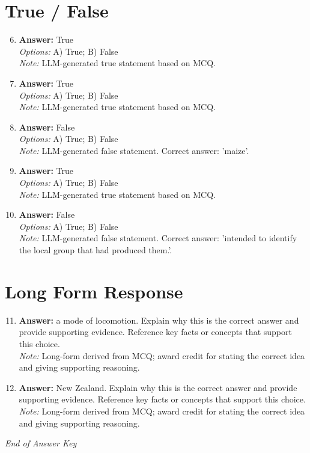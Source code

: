 \documentclass[12pt]{article}
\begin{document}
\section*{True / False}
\begin{enumerate}[label=\arabic*.]
\setcounter{enumi}{5}
\item \textbf{Answer:} True
\\ \textit{Options:} A) True; B) False
\\ \textit{Note:} LLM-generated true statement based on MCQ.
\item \textbf{Answer:} True
\\ \textit{Options:} A) True; B) False
\\ \textit{Note:} LLM-generated true statement based on MCQ.
\item \textbf{Answer:} False
\\ \textit{Options:} A) True; B) False
\\ \textit{Note:} LLM-generated false statement. Correct answer: 'maize'.
\item \textbf{Answer:} True
\\ \textit{Options:} A) True; B) False
\\ \textit{Note:} LLM-generated true statement based on MCQ.
\item \textbf{Answer:} False
\\ \textit{Options:} A) True; B) False
\\ \textit{Note:} LLM-generated false statement. Correct answer: 'intended to identify the local group that had produced them.'.
\end{enumerate}

\section*{Long Form Response}
\begin{enumerate}[label=\arabic*.]
\setcounter{enumi}{10}
\item \textbf{Answer:} a mode of locomotion. Explain why this is the correct answer and provide supporting
evidence. Reference key facts or concepts that support this choice.
\\ \textit{Note:} Long-form derived from MCQ; award credit for stating the correct idea and giving supporting reasoning.
\item \textbf{Answer:} New Zealand. Explain why this is the correct answer and provide supporting evidence.
Reference key facts or concepts that support this choice.
\\ \textit{Note:} Long-form derived from MCQ; award credit for stating the correct idea and giving supporting reasoning.
\end{enumerate}

\vfill
\noindent\textit{End of Answer Key}
\end{document}

